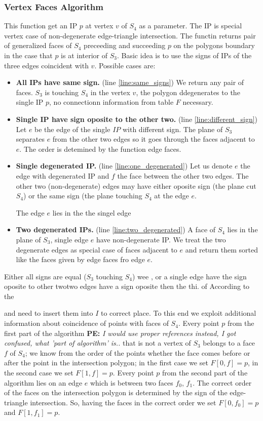 \documentclass{elsarticle}
\newcommand{\notePE}[1]{{\color{Orange} \textbf{PE: } \textit{#1}}}
\begin{document}
\subsubsection{Vertex Faces Algorithm}
This function get an IP $p$ at vertex $v$ of $S_4$ as a parameter. The IP is special vertex case of non-degenerate edge-triangle intersection. 
The functin returns pair of generalized faces of $S_4$ preceeding and succeeding $p$ on the polygons boundary in the case that $p$ is at interior of $S_3$.
Basic idea is to use the signs of IPs of the three edges coincident with $v$. 
Possible cases are:
\begin{itemize}
 \item {\bf All IPs have same sign.} (line \ref{line:same_signs}) We return any pair of faces.  $S_3$ is touching $S_4$ 
 in the vertex $v$, the polygon ddegenerates to the single IP $p$, no connectionn information from table $F$ necessary.
 \item {\bf Single IP have sign oposite to the other two.} (line \ref{line:different_sign}) Let $e$ be the edge of the single $IP$ with different sign. 
 The plane of $S_3$ separates $e$ from the other two edges so it goes through the faces adjacent to $e$. The order is detemined by the function edge faces.
 \item {\bf Single degenerated IP.} (line \ref{line:one_degenerated}) Let us denote $e$ the edge with degenerated IP and $f$ the face between the other two edges.
 The other two (non-degenerate) edges may have either oposite sign (the plane cut $S_4$) or the same sign (the plane touching $S_4$ at the edge $e$.
 
 The edge $e$ lies in the the singel edge
 \item {\bf Two degenerated IPs.} (line \ref{line:two_degenerated}) A face of $S_4$ lies in the plane of $S_3$, single edge $e$ have non-degenerate IP.
 We treat the two degenerate edges as special case of faces adjacent to $e$ and return them sorted like the faces given by edge faces fro edge $e$.
\end{itemize}

Either all signs are equal ($S_3$ touching $S_4$) wee , or
a single edge have the sign oposite to other twotwo edges have a sign oposite then the thi. of According to the 


and need to insert them into $I$ to correct place. To this end we exploit additional information about coincidence of points
with faces of $S_4$. Every point $p$ from the first part of the algorithm \notePE{I would use proper references instead, I got confused, what 'part of algorithm' is..} that is not a vertex of $S_3$ belongs to a face $f$ of $S_4$; we know from the order of the points
whether the face comes before or after the point in the intersection polygon; in the first case we set $F[0,f] =p$, in the second case we set $F[1,f]=p$. 
Every point $p$ from the second part of the algorithm lies on an edge $e$ which is between two faces $f_0$, $f_1$. The correct order of the faces on the 
intersection polygon is determined by the sign of the edge-triangle intersection. So, having the faces in the correct order we set $F[0,f_0]=p$ and $F[1, f_1]=p$.
\end{document}
